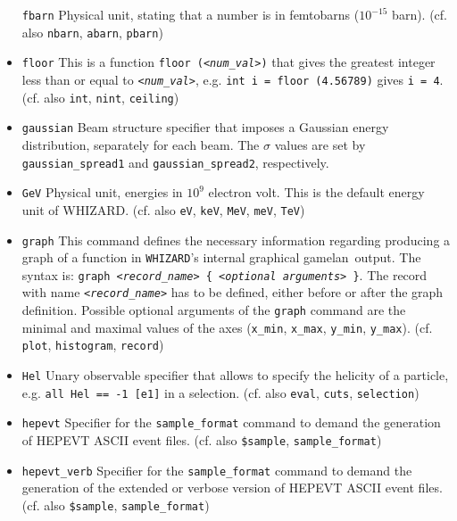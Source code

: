 \documentclass[12pt]{book}
\newcommand{\ttt}[1]{\texttt{#1}}
\newcommand{\whizard}{\ttt{WHIZARD}}
\newcommand{\gamelan}{\textsf{gamelan}}
\begin{document}
\begin{itemize}
\ttt{fbarn} \newline
Physical unit, stating that a number is in femtobarns ($10^{-15}$
barn). (cf. also \ttt{nbarn}, \ttt{abarn}, \ttt{pbarn})
\item
\ttt{floor} \newline
This is a function \ttt{floor ({\em <num\_val>})} that gives the
greatest integer less than or equal to \ttt{{\em <num\_val>}},
e.g. \ttt{int i = floor (4.56789)} gives \ttt{i = 4}. (cf. also
\ttt{int}, \ttt{nint}, \ttt{ceiling})
\item
\ttt{gaussian} \newline
Beam structure specifier that imposes a Gaussian energy distribution,
separately for each beam.  The $\sigma$ values are set by
\ttt{gaussian\_spread1} and \ttt{gaussian\_spread2}, respectively.
\item
\ttt{GeV} \newline
Physical unit, energies in $10^9$ electron volt. This is the default
energy unit of WHIZARD. (cf. also \ttt{eV}, \ttt{keV}, \ttt{MeV}, \ttt{meV},
\ttt{TeV})
\item
\ttt{graph} \newline
This command defines the necessary information regarding producing
a graph of a function in \whizard's internal graphical \gamelan\
output. The syntax is: \ttt{graph {\em <record\_name>} \{ {\em <optional
arguments>} \}}. The record with name \ttt{{\em <record\_name>}} has to be
defined, either before or after the graph definition. Possible optional
arguments of the \ttt{graph} command are the minimal and maximal values
of the axes (\ttt{x\_min}, \ttt{x\_max}, \ttt{y\_min}, \ttt{y\_max}).
(cf. \ttt{plot}, \ttt{histogram}, \ttt{record})
\item
\ttt{Hel} \newline
Unary observable specifier that allows to specify the helicity of a
particle, e.g. \ttt{all Hel == -1 [e1]} in a selection. (cf. also
\ttt{eval}, \ttt{cuts}, \ttt{selection})
\item
\ttt{hepevt} \newline
Specifier for the \ttt{sample\_format} command to demand the
generation of HEPEVT ASCII event files. (cf. also \ttt{\$sample},
\ttt{sample\_format})
\item
\ttt{hepevt\_verb} \newline
Specifier for the \ttt{sample\_format} command to demand the
generation of the extended or verbose version of HEPEVT ASCII event
files. (cf. also \ttt{\$sample}, \ttt{sample\_format})

\end{itemize}
\end{document}
